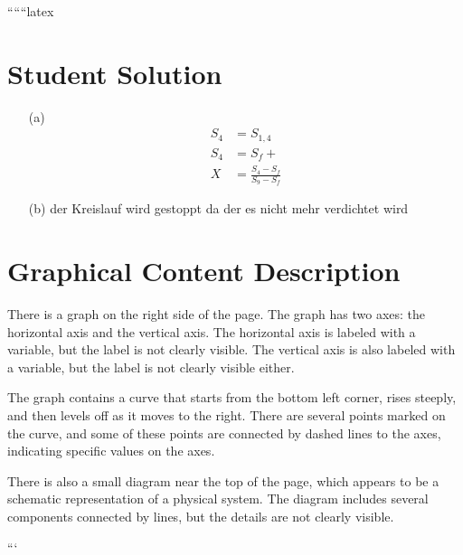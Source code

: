 ``````latex


\section*{Student Solution}

\begin{itemize}
    \item[(a)] 
    \begin{align*}
        S_4 &= S_{1,4} \\
        S_4 &= S_f + \\
        X &= \frac{S_4 - S_f}{S_9 - S_f}
    \end{align*}
    
    \item[(b)] der Kreislauf wird gestoppt da der es nicht mehr verdichtet wird
\end{itemize}

\section*{Graphical Content Description}

There is a graph on the right side of the page. The graph has two axes: the horizontal axis and the vertical axis. The horizontal axis is labeled with a variable, but the label is not clearly visible. The vertical axis is also labeled with a variable, but the label is not clearly visible either.

The graph contains a curve that starts from the bottom left corner, rises steeply, and then levels off as it moves to the right. There are several points marked on the curve, and some of these points are connected by dashed lines to the axes, indicating specific values on the axes.

There is also a small diagram near the top of the page, which appears to be a schematic representation of a physical system. The diagram includes several components connected by lines, but the details are not clearly visible.

```